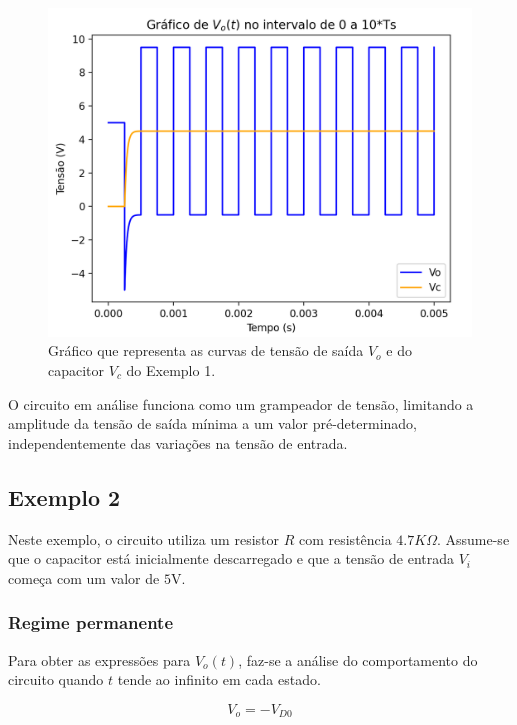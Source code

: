 \begin{figure}[h]
    \label{fig:ex1_numerico}
    \centering
    \includegraphics[width=1\columnwidth]{images/grafico_exemplo1.png}
    \caption{Gráfico que representa as curvas de tensão de saída $V_o$ e do capacitor $V_c$ do Exemplo 1.}
\end{figure}

O circuito em análise funciona como um grampeador de tensão, limitando a amplitude da tensão de saída mínima a um valor pré-determinado, independentemente das variações na tensão de entrada.

\subsection{Exemplo 2}

Neste exemplo, o circuito utiliza um resistor $R$ com resistência $4.7K \Omega$. Assume-se que o capacitor está inicialmente descarregado e que a tensão de entrada $V_i$ começa com um valor de $5$V.

\subsubsection{Regime permanente}

Para obter as expressões para $V_o(t)$, faz-se a análise do comportamento do circuito quando $t$ tende ao infinito em cada estado.

\begin{equation}
    \tag*{Estado 1}
    V_o = - V_{D0}
\end{equation}

